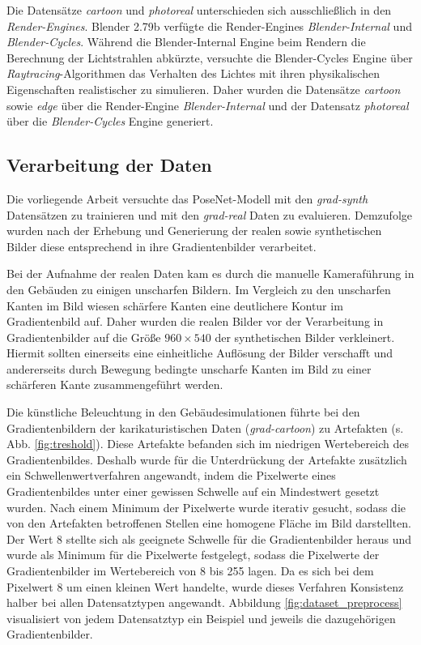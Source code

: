 Die Datensätze \textit{cartoon} und \textit{photoreal} unterschieden sich ausschließlich in den \textit{Render-Engines}. Blender 2.79b verfügte die Render-Engines \textit{Blender-Internal} und \textit{Blender-Cycles}. Während die Blender-Internal Engine beim Rendern die Berechnung der Lichtstrahlen abkürzte, versuchte die Blender-Cycles Engine über \textit{Raytracing}-Algorithmen das Verhalten des Lichtes mit ihren physikalischen Eigenschaften realistischer zu simulieren. Daher wurden die Datensätze \textit{cartoon} sowie \textit{edge} über die Render-Engine \textit{Blender-Internal} und der Datensatz \textit{photoreal} über die \textit{Blender-Cycles} Engine generiert.

\subsection{Verarbeitung der Daten}
Die vorliegende Arbeit versuchte das PoseNet-Modell mit den \textit{grad-synth} Datensätzen zu trainieren und mit den \textit{grad-real} Daten zu evaluieren. Demzufolge wurden nach der Erhebung und Generierung der realen sowie synthetischen Bilder diese entsprechend in ihre Gradientenbilder verarbeitet. 

Bei der Aufnahme der realen Daten kam es durch die manuelle Kameraführung in den Gebäuden zu einigen unscharfen Bildern. Im Vergleich zu den unscharfen Kanten im Bild wiesen schärfere Kanten eine deutlichere Kontur im Gradientenbild auf. Daher wurden die realen Bilder vor der Verarbeitung in Gradientenbilder auf die Größe $960 \times 540$ der synthetischen Bilder verkleinert. Hiermit sollten einerseits eine einheitliche Auflösung der Bilder verschafft und andererseits durch Bewegung bedingte unscharfe Kanten im Bild zu einer schärferen Kante zusammengeführt werden.

Die künstliche Beleuchtung in den Gebäudesimulationen führte bei den Gradientenbildern der karikaturistischen Daten (\textit{grad-cartoon}) zu Artefakten (s. Abb. \ref{fig:treshold}). Diese Artefakte befanden sich im niedrigen Wertebereich des Gradientenbildes. Deshalb wurde für die Unterdrückung der Artefakte zusätzlich ein Schwellenwertverfahren angewandt, indem die Pixelwerte eines Gradientenbildes unter einer gewissen Schwelle auf ein Mindestwert gesetzt wurden. Nach einem Minimum der Pixelwerte wurde iterativ gesucht, sodass die von den Artefakten betroffenen Stellen eine homogene Fläche im Bild darstellten. Der Wert 8 stellte sich als geeignete Schwelle für die Gradientenbilder heraus und wurde als Minimum für die Pixelwerte festgelegt, sodass die Pixelwerte der Gradientenbilder im Wertebereich von 8 bis 255 lagen. Da es sich bei dem Pixelwert 8 um einen kleinen Wert handelte, wurde dieses Verfahren Konsistenz halber bei allen Datensatztypen angewandt. Abbildung \ref{fig:dataset_preprocess} visualisiert von jedem Datensatztyp ein Beispiel und jeweils die dazugehörigen Gradientenbilder.


